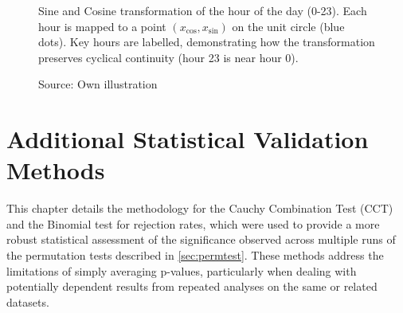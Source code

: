 \begin{appendices}
\begin{figure}[H]
    \caption[Feature Transformation]{Sine and Cosine transformation of the hour of the day (0-23). Each hour is mapped to a point $(x_{\cos}, x_{\sin})$ on the unit circle (blue dots). Key hours are labelled, demonstrating how the transformation preserves cyclical continuity (hour 23 is near hour 0).}
    \label{fig:time-encoding}
    \caption*{Source: Own illustration}
  \end{figure}

  \chapter{Additional Statistical Validation Methods}
  \label{app:cct}

  This chapter details the methodology for the Cauchy Combination Test (CCT) and the Binomial test for rejection rates, which were used to provide a more robust statistical assessment of the significance observed across multiple runs of the permutation tests described in \autoref{sec:permtest}. These methods address the limitations of simply averaging p-values, particularly when dealing with potentially dependent results from repeated analyses on the same or related datasets.


\end{appendices}
